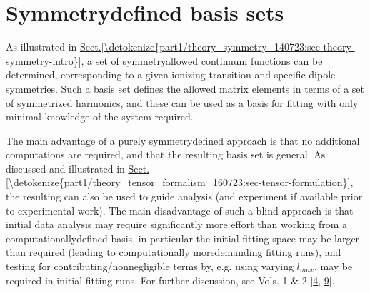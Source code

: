 \documentclass[letterpaper,table,10pt,english]{jupyterBook}
\begin{document}
\section{Symmetry\sphinxhyphen{}defined basis sets}
\label{\detokenize{part2/sym-fitting-intro_240723:symmetry-defined-basis-sets}}
\sphinxAtStartPar
As illustrated in \hyperref[\detokenize{part1/theory_symmetry_140723:sec-theory-symmetry-intro}]{Sect.\@ \ref{\detokenize{part1/theory_symmetry_140723:sec-theory-symmetry-intro}}}, a set of symmetry\sphinxhyphen{}allowed continuum functions can be determined, corresponding to a given ionizing transition and specific dipole symmetries. Such a basis set defines the allowed matrix elements in terms of a set of symmetrized harmonics, and these can be used as a basis for fitting with only minimal knowledge of the system required.

\sphinxAtStartPar
The main advantage of a purely symmetry\sphinxhyphen{}defined approach is that no additional  computations are required, and that the resulting basis set is general. As discussed and illustrated in \hyperref[\detokenize{part1/theory_tensor_formalism_160723:sec-tensor-formulation}]{Sect.\@ \ref{\detokenize{part1/theory_tensor_formalism_160723:sec-tensor-formulation}}}, the resulting {\hyperref[\detokenize{backmatter/glossary:term-channel-functions}]{}} can also be used to guide analysis (and experiment if available prior to experimental work). The main disadvantage of such a blind approach is that initial data analysis may require significantly more effort than working from a computationally\sphinxhyphen{}defined basis, in particular the initial fitting space may be larger than required (leading to computationally more\sphinxhyphen{}demanding fitting runs), and testing for contributing/non\sphinxhyphen{}negligible terms by, e.g. using varying \(l_{max}\), may be required in initial fitting runs. For further discussion, see  Vols. 1 \& 2 {[}\hyperlink{cite.backmatter/bibliography:id676}{4}, \hyperlink{cite.backmatter/bibliography:id677}{9}{]}.
\end{document}
